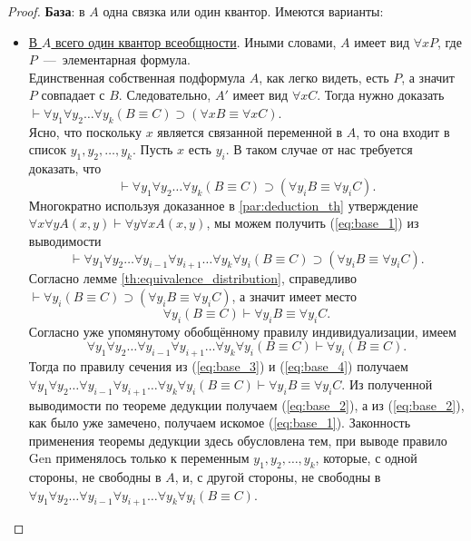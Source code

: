 \begin{proof}
    \textbf{База}: в $A$ одна связка или один квантор. Имеются варианты:
    \begin{itemize}
        \item \underline{В $A$ всего один квантор всеобщности}. Иными словами, $A$ имеет вид $\forall xP$, где $P$~---~элементарная формула. \\
        Единственная собственная подформула $A$, как легко видеть, есть $P$, а значит $P$ совпадает с $B$. Следовательно, $A'$ имеет вид $\forall xC$. Тогда нужно доказать $\vdash \forall y_1\forall y_2\dots\forall y_k(B \equiv C) \supset (\forall xB \equiv \forall xC)$. \\
        Ясно, что поскольку $x$ является связанной переменной в $A$, то она входит в список $y_1, y_2, \dots, y_k$. Пусть $x$ есть $y_i$. В таком случае от нас требуется доказать, что
        \begin{equation}\label{eq:base_1}
            \vdash \forall y_1\forall y_2\dots\forall y_k(B \equiv C) \supset (\forall y_iB \equiv \forall y_iC).
        \end{equation}
        Многократно используя доказанное в \ref{par:deduction_th} утверждение $\forall x\forall yA(x, y) \vdash \forall y\forall xA(x, y)$, мы можем получить (\ref{eq:base_1}) из выводимости
        \begin{equation}\label{eq:base_2}
            \vdash \forall y_1\forall y_2\dots\forall y_{i - 1}\forall y_{i + 1}\dots\forall y_k\forall y_i(B \equiv C) \supset (\forall y_iB \equiv \forall y_iC). 
        \end{equation}
        Согласно лемме \ref{th:equivalence_distribution}, справедливо $\vdash \forall y_i(B \equiv C) \supset (\forall y_iB \equiv \forall y_iC)$, а значит имеет место 
        \begin{equation}\label{eq:base_3}
            \forall y_i(B \equiv C) \vdash \forall y_iB \equiv \forall y_iC.
        \end{equation} 
        Согласно уже упомянутому обобщённому правилу индивидуализации, имеем 
        \begin{equation}\label{eq:base_4}
            \forall y_1\forall y_2\dots\forall y_{i - 1}\forall y_{i + 1}\dots\forall y_k\forall y_i(B \equiv C) \vdash \forall y_i(B \equiv C). 
        \end{equation}
        Тогда по правилу сечения из (\ref{eq:base_3}) и (\ref{eq:base_4}) получаем $\forall y_1\forall y_2\dots\forall y_{i - 1}\forall y_{i + 1}\dots\forall y_k\forall y_i(B \equiv C) \vdash \forall y_iB \equiv \forall y_iC$. Из полученной выводимости по теореме дедукции получаем (\ref{eq:base_2}), а из (\ref{eq:base_2}), как было уже замечено, получаем искомое (\ref{eq:base_1}). Законность применения теоремы дедукции здесь обусловлена тем, при выводе правило Gen применялось только к переменным $y_1, y_2, \dots, y_k$, которые, с одной стороны, не свободны в $A$, и, с другой стороны, не свободны в $\forall y_1\forall y_2\dots\forall y_{i - 1}\forall y_{i + 1}\dots\forall y_k\forall y_i(B \equiv C)$.


\end{itemize}
\end{proof}
